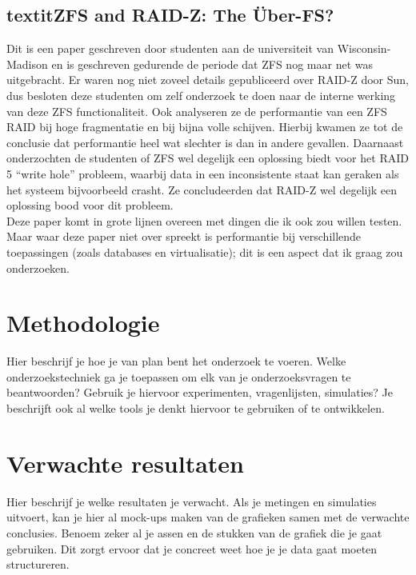 \documentclass[fleqn,10pt]{voorstel}
\begin{document}
\subsection{textit{ZFS and RAID-Z: The Über-FS?} \autocite{BrianHickmann2007}}

Dit is een paper geschreven door studenten aan de universiteit van Wisconsin-Madison en is geschreven gedurende de periode dat ZFS nog maar net was uitgebracht. Er waren nog niet zoveel details gepubliceerd over RAID-Z door Sun, dus besloten deze studenten om zelf onderzoek te doen naar de interne werking van deze ZFS functionaliteit. Ook analyseren ze de performantie van een ZFS RAID bij hoge fragmentatie en bij bijna volle schijven. Hierbij kwamen ze tot de conclusie dat performantie heel wat slechter is dan in andere gevallen. Daarnaast onderzochten de studenten of ZFS wel degelijk een oplossing biedt voor het RAID 5 ``write hole'' probleem, waarbij data in een inconsistente staat kan geraken als het systeem bijvoorbeeld crasht. Ze  concludeerden dat RAID-Z wel degelijk een oplossing bood voor dit probleem. \\
Deze paper komt in grote lijnen overeen met dingen die ik ook zou willen testen. Maar waar deze paper niet over spreekt is performantie bij verschillende toepassingen (zoals databases en virtualisatie); dit is een aspect dat ik graag zou onderzoeken.

\section{Methodologie}
\label{sec:methodologie}

Hier beschrijf je hoe je van plan bent het onderzoek te voeren. Welke onderzoekstechniek ga je toepassen om elk van je onderzoeksvragen te beantwoorden? Gebruik je hiervoor experimenten, vragenlijsten, simulaties? Je beschrijft ook al welke tools je denkt hiervoor te gebruiken of te ontwikkelen.

\section{Verwachte resultaten}
\label{sec:verwachte_resultaten}

Hier beschrijf je welke resultaten je verwacht. Als je metingen en simulaties uitvoert, kan je hier al mock-ups maken van de grafieken samen met de verwachte conclusies. Benoem zeker al je assen en de stukken van de grafiek die je gaat gebruiken. Dit zorgt ervoor dat je concreet weet hoe je je data gaat moeten structureren.
\end{document}

